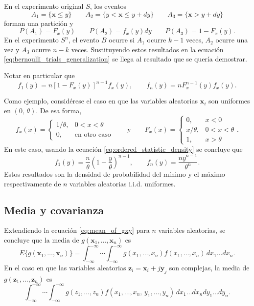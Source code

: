 \documentclass[a4paper]{report}
\newcommand{\x}{\mathbf{x}}
\newcommand{\y}{\mathbf{y}}
\newcommand{\z}{\mathbf{z}}
\begin{document}
En el experimento original \(S\), los eventos
\[
 A_1=\{\x\leq y\}\qquad A_2=\{y<\x\leq y+dy\}\qquad A_3=\{\x>y+dy\}
\]
forman una partición y
\[
 P(A_1)=F_x(y)\qquad P(A_2)=f_x(y)dy\qquad P(A_3)=1-F_x(y).
\]
En el experimento \(S^n\), el evento \(B\) ocurre si \(A_1\) ocurre \(k-1\) veces, \(A_2\) ocurre una vez y \(A_3\) ocurre \(n-k\) veces. Sustituyendo estos resultados en la ecuación \ref{eq:bernoulli_trials_generalization} se llega al resultado que se quería demostrar.

Notar en particular que
\[
 f_1(y)=n[1-F_x(y)]^{n-1}f_x(y),\qquad f_n(y)=nF_x^{n-1}(y)f_x(y).
\]

Como ejemplo, considérese el caso en que las variables aleatorias \(\x_i\) son uniformes en \((0,\,\theta)\). De esa forma,
\[
 f_x(x)
 =\left\{\begin{array}{ll}
   1/\theta, & 0<x<\theta\\ 
   0, & \textrm{en otro caso}
 \end{array} \right.
 \qquad\textrm{y}\qquad
 F_x(x)
 =\left\{\begin{array}{ll}
   0, & x<0\\
   x/\theta, & 0<x<\theta\\ 
   1, & x>\theta
 \end{array} \right..
\]
En este caso, usando la ecuación \ref{eq:ordered_statistic_density} se concluye que
\begin{equation}\label{eq:ordered_statistic_uniform_density}
  f_1(y)=\frac{n}{\theta}\left(1-\frac{y}{\theta}\right)^{n-1},\qquad f_n(y)=\frac{ny^{n-1}}{\theta^n}. 
\end{equation}
Estos resultados son la densidad de probabilidad del mínimo y el máximo respectivamente de \(n\) variables aleatorias i.i.d. uniformes.

\subsection{Media y covarianza}\label{sec:mean_and_covariance}

Extendiendo la ecuación \ref{eq:mean_of_gxy} para \(n\) variables aleatorias, se concluye que la media de \(g(\x_1,\dots,\x_n)\) es
\[
 E\{g(\x_1,\dots,\x_n)\}=\int_{-\infty}^{-\infty}\cdots\int_{-\infty}^{-\infty}g(x_1,\dots,x_n)f(x_1,\dots,x_n)\,dx_1\dots dx_n.
\]
En el caso en que las variables aleatorias \(\z_i=\x_i+j\y_j\) son complejas, la media de \(g(\z_1,\dots,\z_n)\) es
\[
 \int_{-\infty}^{-\infty}\cdots\int_{-\infty}^{-\infty}g(z_1,\dots,z_n)f(x_1,\dots,x_n,\,y_1,\dots,y_n)\,dx_1\dots dx_ndy_1\dots dy_n.
\]
\end{document}
